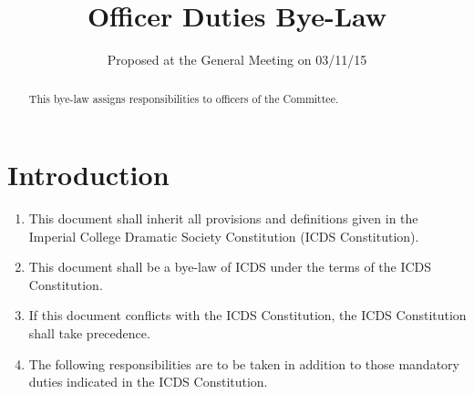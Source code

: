 \documentclass[a4paper]{tufte-handout}
\title{Officer Duties Bye-Law}
\date{Proposed at the General Meeting on 03/11/15}
\begin{document}
\maketitle

\begin{fullwidth}
\itshape

\begin{abstract}
This bye-law assigns responsibilities to officers of the Committee.
\end{abstract}
\end{fullwidth}

\hdashrule{15cm}{1.1pt}{1.1pt}

\section{Introduction}
\begin{enumerate}
    \item This document shall inherit all provisions and definitions given in the Imperial College Dramatic Society Constitution (ICDS Constitution).
    \item This document shall be a bye-law of ICDS under the terms of the ICDS Constitution.
    \item If this document conflicts with the ICDS Constitution, the ICDS Constitution shall take precedence.
    \item The following responsibilities are to be taken in addition to those mandatory duties indicated in the ICDS Constitution.
\end{enumerate}
\end{document}
